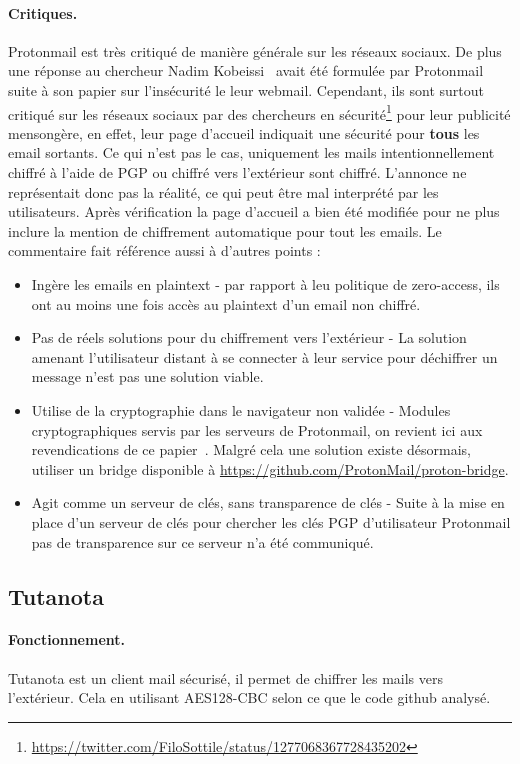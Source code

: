 \paragraph*{Critiques.}
Protonmail est très critiqué de manière générale sur les réseaux sociaux. De plus une réponse au chercheur Nadim Kobeissi~\cite{DBLP:journals/iacr/Kobeissi18a} avait été formulée par Protonmail suite à son papier sur l'insécurité le leur webmail. Cependant, ils sont surtout critiqué sur les réseaux sociaux par des chercheurs en sécurité\footnote{\url{https://twitter.com/FiloSottile/status/1277068367728435202}} pour leur publicité mensongère, en effet, leur page d'accueil indiquait une sécurité pour \textbf{tous} les email sortants. Ce qui n'est pas le cas, uniquement les mails intentionnellement chiffré à l'aide de PGP ou chiffré vers l'extérieur sont chiffré. L'annonce ne représentait donc pas la réalité, ce qui peut être mal interprété par les utilisateurs. Après vérification la page d'accueil a bien été modifiée pour ne plus inclure la mention de chiffrement automatique pour tout les emails. Le commentaire fait référence aussi à d'autres points :
\begin{itemize}
	\item Ingère les emails en plaintext - par rapport à leu politique de zero-access, ils ont au moins une fois accès au plaintext d'un email non chiffré.
	\item Pas de réels solutions pour du chiffrement vers l'extérieur - La solution amenant l'utilisateur distant à se connecter à leur service pour déchiffrer un message n'est pas une solution viable.
	\item Utilise de la cryptographie dans le navigateur non validée - Modules cryptographiques servis par les serveurs de Protonmail, on revient ici aux revendications de ce papier~\cite{DBLP:journals/iacr/Kobeissi18a}. Malgré cela une solution existe désormais, utiliser un bridge disponible à \url{https://github.com/ProtonMail/proton-bridge}.
	\item Agit comme un serveur de clés, sans transparence de clés - Suite à la mise en place d'un serveur de clés pour chercher les clés PGP d'utilisateur Protonmail pas de transparence sur ce serveur n'a été communiqué.
\end{itemize}
\subsection{Tutanota}
\paragraph*{Fonctionnement.}
Tutanota est un client mail sécurisé, il permet de chiffrer les mails vers l'extérieur. Cela en utilisant AES128-CBC selon ce que le code github analysé.
